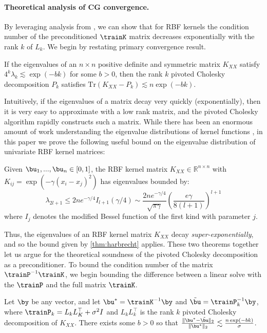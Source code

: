 \paragraph{Theoretical analysis of CG convergence.}
By leveraging analysis from \cite{harbrecht2012low}, we can show that for RBF kernels the condition number of the preconditioned $\trainK$ matrix decreases exponentially with the rank $k$ of $L_k$.
We begin by restating \cite{harbrecht2012low} primary convergence result.
%
\begin{theorem}
If the eigenvalues of an $n \times n$ positive definite and symmetric matrix $K_{XX}$ satisfy $4^{k}\lambda_{k} \lesssim \exp(-bk)$ for some $b>0$, then
the rank $k$ pivoted Cholesky decomposition $P_{k}$ satisfies $\textrm{Tr}(K_{XX} - P_{k}) \lesssim n\exp(-bk)$.
\label{thm:harbrecht}
\end{theorem}
Intuitively, if the eigenvalues of a matrix decay very quickly (exponentially), then it is very easy to approximate with a low rank matrix, and the pivoted Cholesky algorithm rapidly constructs such a matrix.
While there has been an enormous amount of work understanding the eigenvalue distributions of kernel functions , in this paper we prove the following useful bound on the eigenvalue distribution of univariate RBF kernel matrices:
%
\begin{theorem}
\label{thm:eigenvalue_bound}
Given $\bu_1,...,\bu_n \in [0, 1]$, the RBF kernel matrix $K_{XX} \in \mathbb{R}^{n \times n}$ with $K_{ij} = \exp \left(-\gamma(x_i - x_j)^{2}\right)$ has eigenvalues bounded by:
\begin{equation*}
    \lambda_{2l+1} \leq
    2n e^{-\gamma/4} I_{l+1}(\gamma/4) \sim
    \frac{2n e^{-\gamma/4}}{\sqrt{\pi\gamma}}
    \left( \frac{e\gamma}{8(l+1)} \right)^{l+1}
\end{equation*}
where $I_j$ denotes the modified Bessel function of the first kind with parameter $j$.
\end{theorem}
%
Thus, the eigenvalues of an RBF kernel matrix $K_{XX}$ decay \emph{super-exponentially}, and so the bound given by \autoref{thm:harbrecht} applies.
These two theorems together let us argue for the theoretical soundness of the pivoted Cholesky decomposition as a preconditioner.
To bound the condition number of the matrix $\trainP^{-1} \trainK$, we begin bounding the difference between a linear solve with the $\trainP$ and the full matrix $\trainK$.
%
\begin{theorem}
Let $\by$ be any vector, and let $\bu^{*} = \trainK^{-1}\by$ and $\tilde{\bu} = \trainP_{k}^{-1}\by$, where $\trainP_{k}=L_{k} L_K^\top + \sigma^{2}I$ and $L_{k} L_k^\top$ is the rank $k$ pivoted Cholesky decomposition of $K_{XX}$.
There exists some $b>0$ so that $\frac{\Vert \bu^{*} - \tilde{\bu}\Vert_{2}}{\Vert\bu^{*}\Vert_{2}} \lesssim \frac{n\exp(-bk)}{\sigma}$.
\end{theorem}
